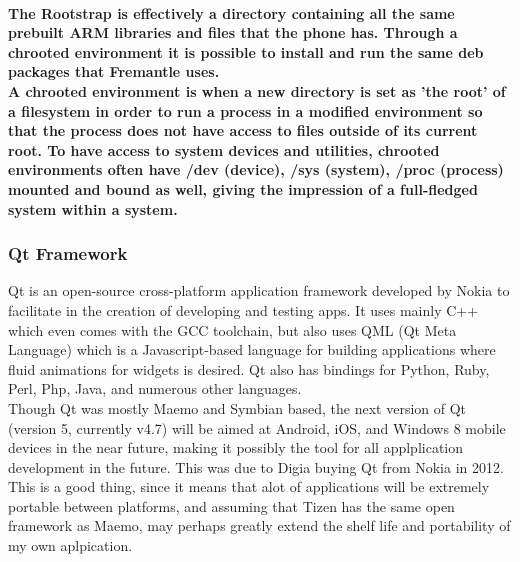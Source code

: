 \documentclass[11pt]{article} %
\begin{document}
\paragraph{The Rootstrap is effectively a directory containing all the same prebuilt ARM libraries and files that the phone has. Through a chrooted environment it is possible to install and run the same deb packages that Fremantle uses. \\A chrooted environment is when a new directory is set as 'the root' of a filesystem in order to run a process in a modified environment so that the process does not have access to files outside of its current root. To have access to system devices and utilities, chrooted environments often have  /dev (device), /sys (system), /proc (process) mounted and bound as well, giving the impression of a full-fledged system within a system.}

\subsubsection{Qt Framework} {
Qt is an open-source cross-platform application framework developed by Nokia to facilitate in the creation of developing and testing apps.  It uses mainly C++ which even comes with the GCC toolchain, but also uses QML (Qt Meta Language) which is a Javascript-based language for building applications where fluid animations for widgets is desired. Qt also has bindings for Python, Ruby, Perl, Php, Java, and numerous other languages.\\

Though Qt was mostly Maemo and Symbian based, the next version of Qt (version 5, currently v4.7) will be aimed at Android, iOS, and Windows 8 mobile devices in the near future, making it possibly the tool for all applplication development in the future. This was due to Digia buying Qt from Nokia in 2012\cite{nokiasell}. This is a good thing, since it means that alot of applications will be extremely portable between platforms, and assuming that Tizen has the same open framework as Maemo, may perhaps greatly extend the shelf life and portability of my own aplpication.
}
\end{document}
